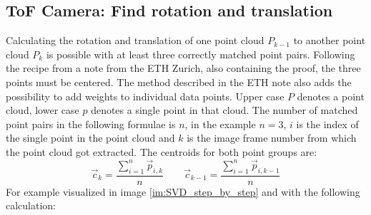 \subsection{ToF Camera: Find rotation and translation}
\label{sec:ToFPosition_SVD}
Calculating the rotation and translation of one point cloud $P_{k-1}$ to another point cloud $P_{k}$ is possible with at least three correctly matched point pairs. Following the recipe from a note from the ETH Zurich, also containing the proof, the three points must be centered. The method described in the ETH note also adds the possibility to add weights to individual data points. Upper case $P$ denotes a point cloud, lower case $p$ denotes a single point in that cloud. The number of matched point pairs in the following formulae is $n$, in the example $n = 3$, $i$ is the index of the single point in the point cloud and $k$ is the image frame number from which the point cloud got extracted.
The centroids for both point groups are:
\begin{equation*}
    \vec{c}_{k}=\frac{\sum_{i=1}^n \vec{p}_{i,k}}{n} \qquad 
    \vec{c}_{k-1}=\frac{\sum_{i=1}^n \vec{p}_{i,k-1}}{n} 
\end{equation*}
For example visualized in image \ref{im:SVD_step_by_step} and with the following calculation:

